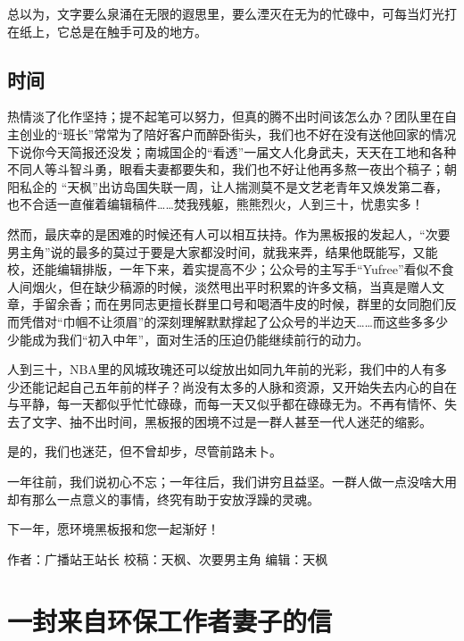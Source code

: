 \documentclass[]{book}
\begin{document}
总以为，文字要么泉涌在无限的遐思里，要么湮灭在无为的忙碌中，可每当灯光打在纸上，它总是在触手可及的地方。

\hypertarget{ux65f6ux95f4}{%
\subsection{时间}\label{ux65f6ux95f4}}

热情淡了化作坚持；提不起笔可以努力，但真的腾不出时间该怎么办？团队里在自主创业的``班长''常常为了陪好客户而醉卧街头，我们也不好在没有送他回家的情况下说你今天简报还没发；南城国企的``看透''一届文人化身武夫，天天在工地和各种不同人等斗智斗勇，眼看夫妻都要失和，我们也不好让他再多熬一夜出个稿子；朝阳私企的 ``天枫''出访岛国失联一周，让人揣测莫不是文艺老青年又焕发第二春，也不合适一直催着编辑稿件\ldots{}\ldots{}焚我残躯，熊熊烈火，人到三十，忧患实多！

然而，最庆幸的是困难的时候还有人可以相互扶持。作为黑板报的发起人，``次要男主角''说的最多的莫过于要是大家都没时间，就我来弄，结果他既能写，又能校，还能编辑排版，一年下来，着实提高不少；公众号的主写手``Yufree''看似不食人间烟火，但在缺少稿源的时候，淡然甩出平时积累的许多文稿，当真是赠人文章，手留余香；而在男同志更擅长群里口号和喝酒牛皮的时候，群里的女同胞们反而凭借对``巾帼不让须眉''的深刻理解默默撑起了公众号的半边天\ldots{}\ldots{}而这些多多少少能成为我们``初入中年''，面对生活的压迫仍能继续前行的动力。

人到三十，NBA里的风城玫瑰还可以绽放出如同九年前的光彩，我们中的人有多少还能记起自己五年前的样子？尚没有太多的人脉和资源，又开始失去内心的自在与平静，每一天都似乎忙忙碌碌，而每一天又似乎都在碌碌无为。不再有情怀、失去了文字、抽不出时间，黑板报的困境不过是一群人甚至一代人迷茫的缩影。

是的，我们也迷茫，但不曾却步，尽管前路未卜。

一年往前，我们说初心不忘；一年往后，我们讲穷且益坚。一群人做一点没啥大用却有那么一点意义的事情，终究有助于安放浮躁的灵魂。

下一年，愿环境黑板报和您一起渐好！

作者：广播站王站长
校稿：天枫、次要男主角
编辑：天枫

\hypertarget{ux4e00ux5c01ux6765ux81eaux73afux4fddux5de5ux4f5cux8005ux59bbux5b50ux7684ux4fe1}{%
\section{一封来自环保工作者妻子的信}\label{ux4e00ux5c01ux6765ux81eaux73afux4fddux5de5ux4f5cux8005ux59bbux5b50ux7684ux4fe1}}
\end{document}

